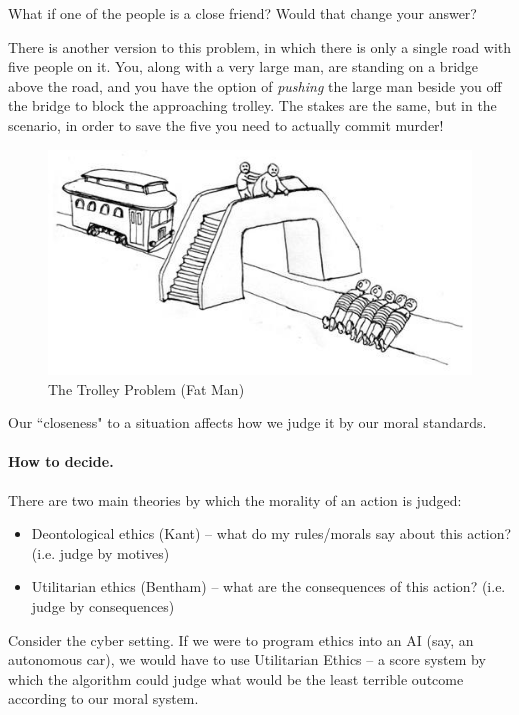 What if one of the people is a close friend? Would that change your answer?

There is another version to this problem, in which there is only a single road
with five people on it. You, along with a very large man, are standing on a
bridge above the road, and you have the option of \textit{pushing} the large man
beside you off the bridge to block the approaching trolley. The stakes are the
same, but in the scenario, in order to save the five you need to actually commit
murder!

\begin{figure}[!ht]
    \centering
    \includegraphics[width=\textwidth]{images/The_Trolley_Problem_Fat_Man.jpg}
    \caption{The Trolley Problem (Fat Man)}
    \label{fig:trolley_problem_fat_man}
\end{figure}

Our ``closeness" to a situation affects how we judge it by our moral standards.

\paragraph{How to decide.} There are two main theories by which the morality of
an action is judged:
\begin{itemize}
    \item Deontological ethics (Kant) -- what do my rules/morals say about this
    action? (i.e. judge by motives)
    \item Utilitarian ethics (Bentham) -- what are the consequences of this
    action? (i.e. judge by consequences)
\end{itemize}

Consider the cyber setting. If we were to program ethics into an AI (say, an
autonomous car), we would have to use Utilitarian Ethics -- a score system by
which the algorithm could judge what would be the least terrible outcome
according to our moral system.


